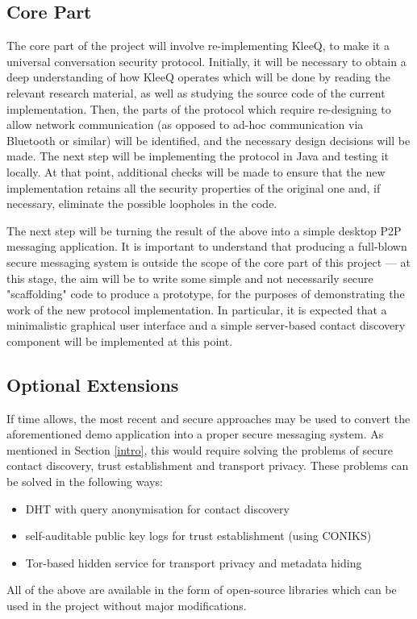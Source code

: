 \documentclass[a4paper, 12pt]{report}
\begin{document}
\begin{appendices}
\subsection{Core Part}
The core part of the project will involve re-implementing KleeQ, to make it a universal conversation security protocol. Initially, it will be necessary to obtain a deep understanding of how KleeQ operates which will be done by reading the relevant research material, as well as studying the source code of the current implementation. Then, the parts of the protocol which require re-designing to allow network communication (as opposed to ad-hoc communication via Bluetooth or similar) will be identified, and the necessary design decisions will be made. The next step will be implementing the protocol in Java and testing it locally. At that point, additional checks will be made to ensure that the new implementation retains all the security properties of the original one and, if necessary, eliminate the possible loopholes in the code.

\vspace{\baselineskip}
\noindent
The next step will be turning the result of the above into a simple desktop P2P messaging application. It is important to understand that producing a full-blown secure messaging system is outside the scope of the core part of this project --- at this stage, the aim will be to write some simple and not necessarily secure "scaffolding" code to produce a prototype, for the purposes of demonstrating the work of the new protocol implementation. In particular, it is expected that a minimalistic graphical user interface and a simple server-based contact discovery component will be implemented at this point.


\subsection{Optional Extensions}
If time allows, the most recent and secure approaches may be used to convert the aforementioned demo application into a proper secure messaging system. As mentioned in Section \ref{intro}, this would require solving the problems of secure contact discovery, trust establishment and transport privacy. These problems can be solved in the following ways:
\begin{itemize}
    \item DHT with query anonymisation for contact discovery
    \item self-auditable public key logs for trust establishment (using CONIKS)
    \item Tor-based hidden service for transport privacy and metadata hiding
\end{itemize}
All of the above are available in the form of open-source libraries which can be used in the project without major modifications.


\end{appendices}
\end{document}
